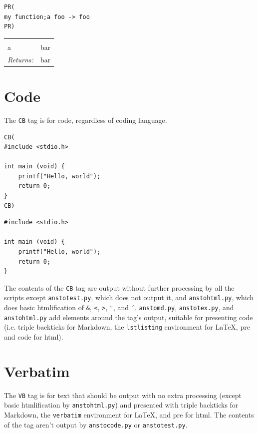 \documentclass{report}
\begin{document}
\begin{verbatim}
PR(
my function;a foo -> foo
PR)
\end{verbatim}

\noindent\begin{tabular}{ |p{1.9cm} p{8cm}| }
\hline
\rowcolor[HTML]{CCCCCC} \multicolumn{2}{|l|}{\bf my function} \\
a & bar \\
\textit{Returns:} & bar \\
\hline
\end{tabular}

\section{Code}
\label{code}

The \texttt{CB} tag is for code, regardless of coding language.

\begin{verbatim}
CB(
#include <stdio.h>

int main (void) {
    printf("Hello, world");
    return 0;
}
CB)
\end{verbatim}

\begin{lstlisting}
#include <stdio.h>

int main (void) {
    printf("Hello, world");
    return 0;
}
\end{lstlisting}

The contents of the \texttt{CB} tag are output without further processing by all the scripts except \texttt{anstotest.py}, which does not output it, and \texttt{anstohtml.py}, which does basic htmlification of \texttt{\&}, \texttt{<}, \texttt{>}, \texttt{"}, and \texttt{'}. \texttt{anstomd.py}, \texttt{anstotex.py}, and \texttt{anstohtml.py} add elements around the tag's output, suitable for presenting code (i.e. triple backticks for Markdown, the \texttt{lstlisting} environment for \LaTeX{}, pre and code for html).

\section{Verbatim}
\label{verbatim}

The \texttt{VB} tag is for text that should be output with no extra processing (except basic htmlification by \texttt{anstohtml.py}) and presented with triple backticks for Markdown, the \texttt{verbatim} environment for \LaTeX{}, and pre for html. The contents of the tag aren't output by \texttt{anstocode.py} or \texttt{anstotest.py}.
\end{document}
